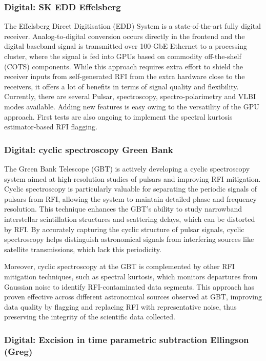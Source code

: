 \subsubsection{Digital: SK EDD Effelsberg}
The Effelsberg Direct Digitisation (EDD) System is a state-of-the-art fully digital receiver. Analog-to-digital conversion occurs directly in the frontend and the digital baseband signal is transmitted over 100-GbE Ethernet to a processing cluster, where the signal is fed into GPUs based on commodity off-the-shelf (COTS) components. While this approach requires extra effort to shield the receiver inputs from self-generated RFI from the extra hardware close to the receivers, it offers a lot of benefits in terms of signal quality and flexibility. Currently, there are several Pulsar, spectroscopy, spectro-polarimetry and VLBI modes available. Adding new features is easy owing to the versatility of the GPU approach. First tests are also ongoing to implement the spectral kurtosis estimator-based RFI flagging. 

\subsubsection{Digital: cyclic spectroscopy Green Bank}

The Green Bank Telescope (GBT) is actively developing a cyclic spectroscopy system aimed at high-resolution studies of pulsars and improving RFI mitigation. Cyclic spectroscopy is particularly valuable for separating the periodic signals of pulsars from RFI, allowing the system to maintain detailed phase and frequency resolution. This technique enhances the GBT’s ability to study narrowband interstellar scintillation structures and scattering delays, which can be distorted by RFI. By accurately capturing the cyclic structure of pulsar signals, cyclic spectroscopy helps distinguish astronomical signals from interfering sources like satellite transmissions, which lack this periodicity.

Moreover, cyclic spectroscopy at the GBT is complemented by other RFI mitigation techniques, such as spectral kurtosis, which monitors departures from Gaussian noise to identify RFI-contaminated data segments. This approach has proven effective across different astronomical sources observed at GBT, improving data quality by flagging and replacing RFI with representative noise, thus preserving the integrity of the scientific data collected.

\subsubsection{Digital: Excision in time parametric subtraction Ellingson (Greg)}


